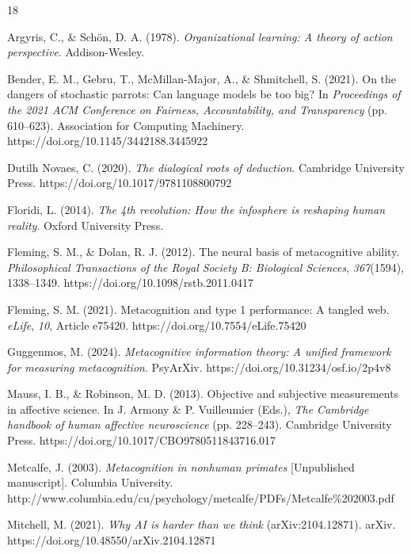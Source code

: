 \documentclass[11pt, a4paper]{article}
\begin{document}
\begin{thebibliography}{18}

Argyris, C., \& Schön, D. A. (1978). \textit{Organizational learning: A theory of action perspective}. Addison-Wesley.

Bender, E. M., Gebru, T., McMillan-Major, A., \& Shmitchell, S. (2021). On the dangers of stochastic parrots: Can language models be too big? In \textit{Proceedings of the 2021 ACM Conference on Fairness, Accountability, and Transparency} (pp. 610–623). Association for Computing Machinery. https://doi.org/10.1145/3442188.3445922

Dutilh Novaes, C. (2020). \textit{The dialogical roots of deduction}. Cambridge University Press. https://doi.org/10.1017/9781108800792

Floridi, L. (2014). \textit{The 4th revolution: How the infosphere is reshaping human reality}. Oxford University Press.

Fleming, S. M., \& Dolan, R. J. (2012). The neural basis of metacognitive ability. \textit{Philosophical Transactions of the Royal Society B: Biological Sciences}, \textit{367}(1594), 1338–1349. https://doi.org/10.1098/rstb.2011.0417

Fleming, S. M. (2021). Metacognition and type 1 performance: A tangled web. \textit{eLife}, \textit{10}, Article e75420. https://doi.org/10.7554/eLife.75420

Guggenmos, M. (2024). \textit{Metacognitive information theory: A unified framework for measuring metacognition}. PsyArXiv. https://doi.org/10.31234/osf.io/2p4v8

Mauss, I. B., \& Robinson, M. D. (2013). Objective and subjective measurements in affective science. In J. Armony \& P. Vuilleumier (Eds.), \textit{The Cambridge handbook of human affective neuroscience} (pp. 228–243). Cambridge University Press. https://doi.org/10.1017/CBO9780511843716.017

Metcalfe, J. (2003). \textit{Metacognition in nonhuman primates} [Unpublished manuscript]. Columbia University. http://www.columbia.edu/cu/psychology/metcalfe/PDFs/Metcalfe\%202003.pdf

Mitchell, M. (2021). \textit{Why AI is harder than we think} (arXiv:2104.12871). arXiv. https://doi.org/10.48550/arXiv.2104.12871


\end{thebibliography}
\end{document}
